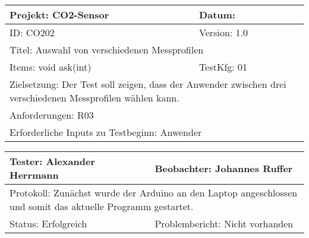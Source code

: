 \begin{table}[!hbt]
	
	\centering
	
	\begin{tabular}{|p{5cm}|p{5cm}|}
		
		\hline
		Projekt: CO2-Sensor & Datum: \\
		\hline
		ID: CO202 & Version: 1.0 \\
		\hline
		\multicolumn{2}{|l|}{Titel: Auswahl von verschiedenen Messprofilen} \\
		\hline
		Items: void ask(int) & TestKfg: 01 \\
		\hline
		\multicolumn{2}{|p{\textwidth-2\tabcolsep}|}{Zielsetzung: Der Test soll zeigen, dass der Anwender zwischen drei verschiedenen Messprofilen wählen kann.} \\
		\hline
		\multicolumn{2}{|l|}{Anforderungen: R03} \\
		\hline
		\multicolumn{2}{|l|}{Erforderliche Inputs zu Testbeginn: Anwender} \\
		\hline
		
	\end{tabular}
	
	\label{tab:Test_2}
	
\end{table}

\begin{table}[!hbt]
	
	\centering
	
	\begin{tabular}{|p{8cm}|p{8cm}|}
		
		\hline
		Tester: Alexander Herrmann & Beobachter: Johannes Ruffer \\
		\hline
		\multicolumn{2}{|l|}{Protokoll: Zunächst wurde der Arduino an den Laptop angeschlossen und somit das aktuelle Programm gestartet. } \\	\hline
		Status: Erfolgreich & Problembericht: Nicht vorhanden \\
		\hline
		
	\end{tabular}
	
	\label{tab:Tester2}
	
\end{table}

